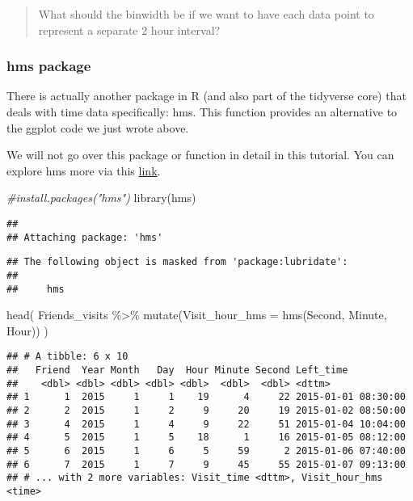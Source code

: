 \documentclass[
]{book}
\newenvironment{Shaded}{\begin{snugshade}}{\end{snugshade}}
\newcommand{\AttributeTok}[1]{\textcolor[rgb]{0.77,0.63,0.00}{#1}}
\newcommand{\CommentTok}[1]{\textcolor[rgb]{0.56,0.35,0.01}{\textit{#1}}}
\newcommand{\FunctionTok}[1]{\textcolor[rgb]{0.00,0.00,0.00}{#1}}
\newcommand{\NormalTok}[1]{#1}
\newcommand{\SpecialCharTok}[1]{\textcolor[rgb]{0.00,0.00,0.00}{#1}}
\begin{document}
\begin{quote}
What should the binwidth be if we want to have each data point to represent a separate 2 hour interval?
\end{quote}

\hypertarget{hms-package}{%
\subsubsection{hms package}\label{hms-package}}

There is actually another package in R (and also part of the tidyverse core) that deals with time data specifically: hms. This function provides an alternative to the ggplot code we just wrote above.

We will not go over this package or function in detail in this tutorial. You can explore hms more via this \href{https://cran.r-project.org/web/packages/hms/hms.pdf}{link}.

\begin{Shaded}
\begin{Highlighting}[]
\CommentTok{\#install.packages("hms")}
\FunctionTok{library}\NormalTok{(hms)}
\end{Highlighting}
\end{Shaded}

\begin{verbatim}
## 
## Attaching package: 'hms'
\end{verbatim}

\begin{verbatim}
## The following object is masked from 'package:lubridate':
## 
##     hms
\end{verbatim}

\begin{Shaded}
\begin{Highlighting}[]
\FunctionTok{head}\NormalTok{(}
\NormalTok{    Friends\_visits }\SpecialCharTok{\%\textgreater{}\%} 
    \FunctionTok{mutate}\NormalTok{(}\AttributeTok{Visit\_hour\_hms =} \FunctionTok{hms}\NormalTok{(Second, Minute, Hour))}
\NormalTok{    )}
\end{Highlighting}
\end{Shaded}

\begin{verbatim}
## # A tibble: 6 x 10
##   Friend  Year Month   Day  Hour Minute Second Left_time          
##    <dbl> <dbl> <dbl> <dbl> <dbl>  <dbl>  <dbl> <dttm>             
## 1      1  2015     1     1    19      4     22 2015-01-01 08:30:00
## 2      2  2015     1     2     9     20     19 2015-01-02 08:50:00
## 3      4  2015     1     4     9     22     51 2015-01-04 10:04:00
## 4      5  2015     1     5    18      1     16 2015-01-05 08:12:00
## 5      6  2015     1     6     5     59      2 2015-01-06 07:40:00
## 6      7  2015     1     7     9     45     55 2015-01-07 09:13:00
## # ... with 2 more variables: Visit_time <dttm>, Visit_hour_hms <time>
\end{verbatim}
\end{document}
